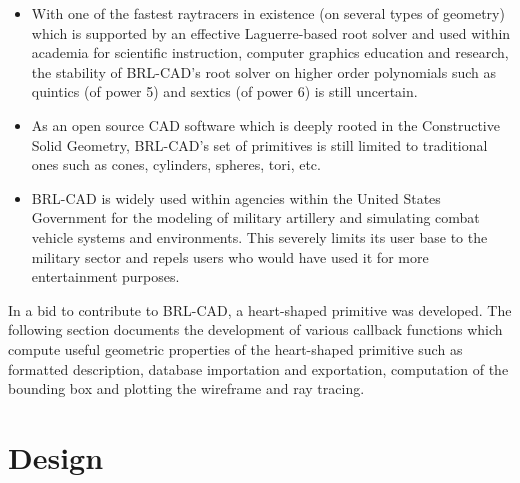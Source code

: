 \begin{itemize}
\item With   one   of   the   fastest   ray­tracers   in   existence   (on   several   types   of  
geometry)   which   is   supported   by   an   effective   Laguerre-­based   root   solver  
and   used   within   academia   for   scientific   instruction,   computer   graphics  
education   and   research,   the   stability   of   BRL­-CAD's   root   solver   on  
higher ­order   polynomials   such   as   quintics   (of   power   5)   and   sextics   (of  
power 6) is still uncertain.

\item As   an   open   source   CAD   software   which   is   deeply   rooted   in   the  
Constructive   Solid   Geometry,   BRL-­CAD's   set   of   primitives   is   still   limited  
to traditional ones such as cones, cylinders, spheres, tori, etc.

\item BRL­-CAD   is   widely   used   within   agencies   within   the   United   States  
Government   for   the   modeling   of   military   artillery   and   simulating   combat  vehicle   systems   and   environments.   This   severely limits   its   user   base   to  the   military   sector   and   repels   users   who  would have used it for more entertainment purposes.
\end{itemize}

In   a   bid   to contribute to BRL-CAD, a   heart-­shaped   primitive was developed. The 
 following section documents the development of various   callback   functions   which   compute   useful  
geometric   properties   of   the   heart-­shaped   primitive   such   as   formatted  
description,   database   importation   and   exportation,   computation   of   the   bounding  
box and plotting the wireframe and ray tracing.


\section{Design}

